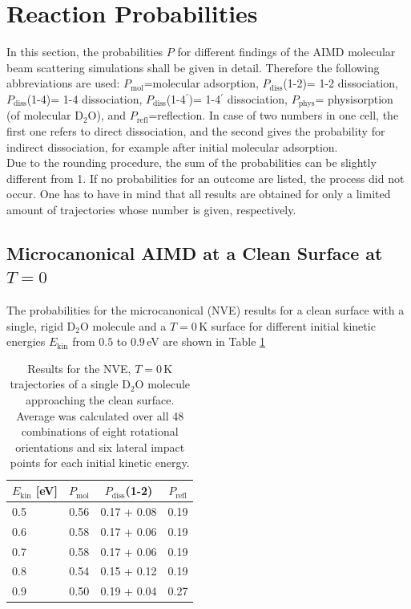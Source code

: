 \documentclass[11pt,DIV=13,BCOR=5mm,a4paper,headinclude]{scrbook}
\begin{document}
\section{Reaction Probabilities}\label{reactionprobabilities}
In this section, the probabilities $P$ for different findings of the AIMD molecular beam scattering simulations shall be given in detail.
Therefore the following abbreviations are used: $P_\textrm{mol}$=molecular adsorption, 
 $P_\textrm{diss}$(1-2)= 1-2 dissociation, $P_\textrm{diss}$(1-4)= 1-4 dissociation, $P_\textrm{diss}$(1-4$^\prime$)= 1-4$^\prime$ dissociation, $P_\textrm{phys}$= physisorption (of molecular D$_2$O), and $P_\textrm{refl}$=reflection.
In case of two numbers in one cell, the first one refers to direct dissociation, and the second gives the probability for indirect dissociation, for example after initial molecular adsorption.
\\
Due to the rounding procedure, the sum of the probabilities can be slightly different from 1.
If no probabilities for an outcome are listed, the process did not occur.
One has to have in mind that all results are obtained for only a limited amount of trajectories whose number is given, respectively.


\subsection{Microcanonical AIMD at a Clean Surface at $T=0$}
The probabilities for the microcanonical (NVE) results for a clean surface with a single, rigid D$_2$O molecule and a $T=0\,$K surface for different initial kinetic energies $E_\textrm{kin}$ from $0.5$ to $0.9\,$eV are shown in Table \ref{tab:mic_ekin}

\begin{table}[!h]
 \centering
  \caption{Results for the NVE, $T=0\,$K trajectories of a single D$_2$O molecule approaching the clean surface.
Average was calculated over all 48 combinations of eight rotational orientations and six lateral impact points for each initial kinetic energy.}
%
 \begin{tabular}{l|ccc}
\toprule
 $E_\textrm{kin}$ [eV]&$P_\textrm{mol}$ & $P_\textrm{diss}$(1-2) & $P_\textrm{refl}$ \\\midrule
 0.5 & 0.56& 0.17 + 0.08& 0.19\\
 0.6 & 0.58& 0.17 + 0.06& 0.19\\
 0.7 & 0.58& 0.17 + 0.06& 0.19\\
 0.8 & 0.54& 0.15 + 0.12& 0.19\\
 0.9 & 0.50& 0.19 + 0.04& 0.27\\\bottomrule
\end{tabular}
 \label{tab:mic_ekin}
\end{table}
%
\end{document}
